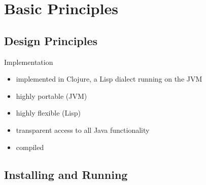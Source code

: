 \documentclass{beamer}
\begin{document}

\section{Basic Principles}

\subsection{Design Principles}

\begin{frame}

  \onslide<+->

  \begin{block}{Implementation}
    \begin{itemize}
    \item<+-> implemented in Clojure, a Lisp dialect running on the JVM
    \item<+-> highly portable (JVM)
    \item<+-> highly flexible (Lisp)
    \item<+-> transparent access to all Java functionality
    \item<+-> compiled
    \end{itemize}
  \end{block}
\end{frame}

\subsection{Installing and Running}
\end{document}
